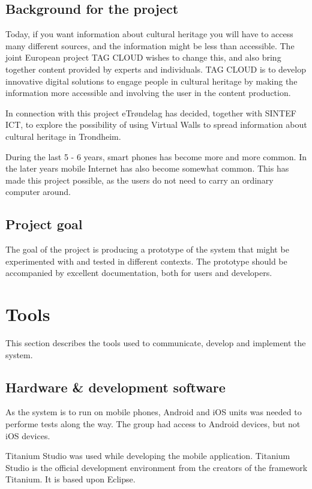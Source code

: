 \documentclass[11pt]{book}
\begin{document}
\subsection{Background for the project}
Today, if you want information about cultural heritage you will have to access many different sources, and the information might be less than accessible. The joint European project TAG CLOUD wishes to change this, and also bring together content provided by experts and individuals. TAG CLOUD is to develop innovative digital solutions to engage people in cultural heritage by making the information more accessible and involving the user in the content production.

In connection with this project eTrøndelag has decided, together with SINTEF ICT, to explore the possibility of using Virtual Walls to spread information about cultural heritage in Trondheim.

During the last 5 - 6 years, smart phones has become more and more common. In the later years mobile Internet has also become somewhat common. This has made this project possible, as the users do not need to carry an ordinary computer around.

\subsection{Project goal}
The goal of the project is producing a prototype of the system that might be experimented with and tested in different contexts. The prototype should be accompanied by excellent documentation, both for users and developers.

\section{Tools}
This section describes the tools used to communicate, develop and implement the system.

\subsection{Hardware \& development software}
As the system is to run on mobile phones, Android and iOS units was needed to performe tests along the way. The group had access to Android devices, but not iOS devices.

Titanium Studio\cite{titaniumStudio} was used while developing the mobile application. Titanium Studio is the official development environment from the creators of the framework Titanium. It is based upon Eclipse.
\end{document}
